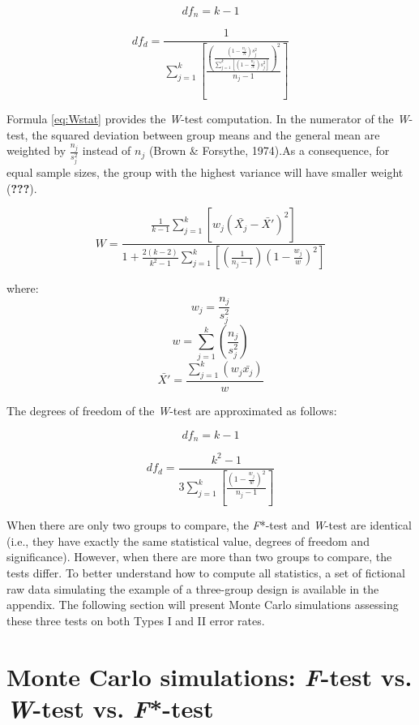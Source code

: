 \documentclass[man,floatsintext]{apa6}
\begin{document}
\begin{equation} 
df_n= k-1
\label{eq:BFnumDF}
\end{equation}

\begin{equation} 
df_d= \frac{1}{\sum_{j=1}^k[\frac{(\frac{(1-\frac{n_j}{N})s_j^2}{\sum_{j=1}^k[(1-\frac{n_j}{N})s_j^2]})^2}{n_j-1}]}
\label{eq:BFdenomDF}
\end{equation}

Formula \eqref{eq:Wstat} provides the \emph{W}-test computation. In the
numerator of the \emph{W}-test, the squared deviation between group
means and the general mean are weighted by \(\frac{n_j}{s_j^2}\) instead
of \(n_j\) (Brown \& Forsythe, 1974).As a consequence, for equal sample
sizes, the group with the highest variance will have smaller weight
({\textbf{???}}).

\begin{equation} 
W=\frac{\frac{1}{k-1}\sum_{j=1}^k[w_j(\bar{X_j}-\bar{X'})^2]}
{1+\frac{2(k-2)}{k^2-1}\sum_{j=1}^k[(\frac{1}{n_j-1})(1-\frac{w_j}{w})^2]}
\label{eq:Wstat}
\end{equation}

where: \[w_j=\frac{n_j}{s_j^2}\] \[w=\sum_{j=1}^k(\frac{n_j}{s_j^2})\]
\[\bar{X'}=\frac{\sum_{j=1}^k(w_j\bar{x_j})}{w}\]

The degrees of freedom of the \emph{W}-test are approximated as follows:

\begin{equation} 
df_n= k-1
\label{eq:WnumDF}
\end{equation}

\begin{equation}
df_d= \frac{k^2-1}{3\sum_{j=1}^k[\frac{(1-\frac{w_j}{w})^2}{n_j-1}]}
\label{eq:WdenomDF}
\end{equation}

When there are only two groups to compare, the \emph{F}*-test and
\emph{W}-test are identical (i.e., they have exactly the same
statistical value, degrees of freedom and significance). However, when
there are more than two groups to compare, the tests differ. To better
understand how to compute all statistics, a set of fictional raw data
simulating the example of a three-group design is available in the
appendix. The following section will present Monte Carlo simulations
assessing these three tests on both Types I and II error rates.

\section{\texorpdfstring{Monte Carlo simulations: \emph{F}-test vs.
\emph{W}-test vs.
\emph{F}*-test}{Monte Carlo simulations: F-test vs. W-test vs. F*-test}}\label{monte-carlo-simulations-f-test-vs.-w-test-vs.-f-test}
\end{document}
